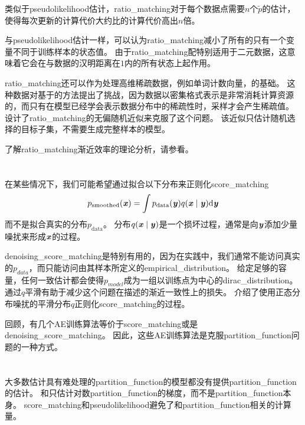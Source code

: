 
类似于\gls{pseudolikelihood}估计，\gls{ratio_matching}对于每个数据点需要$n$个$\tilde{p}$的估计，使得每次更新的计算代价大约比的计算代价高出$n$倍。


与\gls{pseudolikelihood}估计一样，可以认为\gls{ratio_matching}减小了所有的只有一个变量不同于训练样本的状态值。
由于\gls{ratio_matching}配特别适用于二元数据，这意味着它会在与数据的汉明距离在$1$内的所有状态上起作用。


\gls{ratio_matching}还可以作为处理高维稀疏数据，例如单词计数向量，的基础。
这种数据对基于的方法提出了挑战，因为数据以密集格式表示是非常消耗计算资源的，而只有在模型已经学会表示数据分布中的稀疏性时，采样才会产生稀疏值。
\cite{Dauphin+Bengio-NIPS2013}设计了\gls{ratio_matching}的无偏随机近似来克服了这个问题。
该近似只估计随机选择的目标子集，不需要生成完整样本的模型。


了解\gls{ratio_matching}渐近效率的理论分析，请参看\cite{Marlin11-small}。


\section{}
\label{sec:denoising_score_matching}
在某些情况下，我们可能希望通过拟合以下分布来正则化\gls{score_matching}
\begin{equation}
	p_{\text{smoothed}}(\boldsymbol{\mathit{x}}) = \int p_{\text{data}} (\boldsymbol{\mathit{y}}) q( \boldsymbol{\mathit{x}} \mid \boldsymbol{\mathit{y}}) \mathrm{d} \boldsymbol{\mathit{y}}
\end{equation}
而不是拟合真实的分布$p_{\text{data}}$。
分布$q(\boldsymbol{\mathit{x}} \mid \boldsymbol{\mathit{y}})$是一个损坏过程，通常是向$\boldsymbol{\mathit{y}}$添加少量噪扰来形成$\boldsymbol{\mathit{x}}$的过程。


\gls{denoising_score_matching}是特别有用的，因为在实践中，我们通常不能访问真实的$p_{data}$，而只能访问由其样本所定义的\gls{empirical_distribution}。
给定足够的容量，任何一致估计都会使得$p_{model}$成为一组以训练点为中心的\gls{dirac_distribution}。
通过$q$平滑有助于减少这个问题在描述的渐近一致性上的损失。
\cite{Kingma+LeCun-2010}介绍了使用正态分布噪扰的平滑分布$q$正则化\gls{score_matching}的过程。


回顾，有几个\gls{AE}训练算法等价于\gls{score_matching}或是\gls{denoising_score_matching}。
因此，这些\gls{AE}训练算法是克服\gls{partition_function}问题的一种方式。


\section{}
\label{sec:noise_contrastive_estimation}
大多数估计具有难处理的\gls{partition_function}的模型都没有提供\gls{partition_function}的估计。
和只估计对数\gls{partition_function}的梯度，而不是\gls{partition_function}本身。
\gls{score_matching}和\gls{pseudolikelihood}避免了和\gls{partition_function}相关的计算量。 


